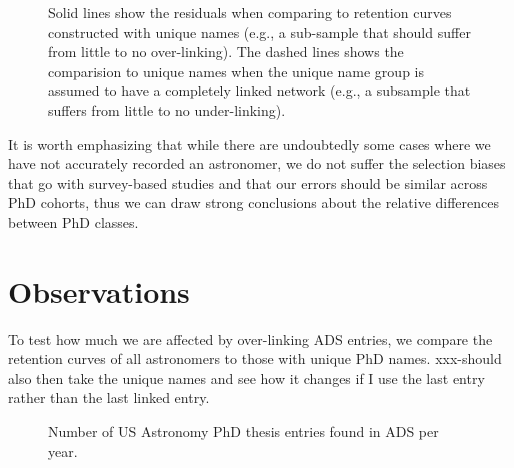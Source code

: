 \documentclass{emulateapj}
\begin{document}
\begin{figure}
  \caption{Solid lines show the residuals when comparing to retention curves constructed with unique names (e.g., a sub-sample that should suffer from little to no over-linking).  The dashed lines shows the comparision to unique names when the unique name group is assumed to have a completely linked network (e.g., a subsample that suffers from little to no under-linking).  \label{fig:unames}}
  \end{figure}


It is worth emphasizing that while there are undoubtedly some cases where we have not accurately recorded an astronomer, we do not suffer the selection biases that go with survey-based studies and that our errors should be similar across PhD cohorts, thus we can draw strong conclusions about the relative differences between PhD classes.

\section{Observations}

To test how much we are affected by over-linking ADS entries, we compare the retention curves of all astronomers to those with unique PhD names.  xxx-should also then take the unique names and see how it changes if I use the last entry rather than the last linked entry.


\begin{figure}
  \caption{Number of US Astronomy PhD thesis entries found in ADS per year. \label{fig:phdperyear}}
\end{figure}

\begin{figure*}
  \caption{Plot of how long PhD astronomers stay active in the ADS archive.  Error bars are set by comparing to a subset of astronomers with more unique names as outlined in \S\ref{sec:db_construct}.   \label{fig:active_curves}}
  \end{figure*}


\begin{figure*}
  \caption{Like Figure~\ref{fig:active_curves}, but now using the most recent connected paper where the author is the first author.  The dashed lines show the curves from Figure~\ref{fig:active_curves} for comparison. The downturn in the older curves (1999-2004) could be an artifact caused by astronomers who lead a paper only every few years, e.g., two years from now those curves could rise back up.  \label{fig:1stA_active}}
\end{figure*}
\end{document}
